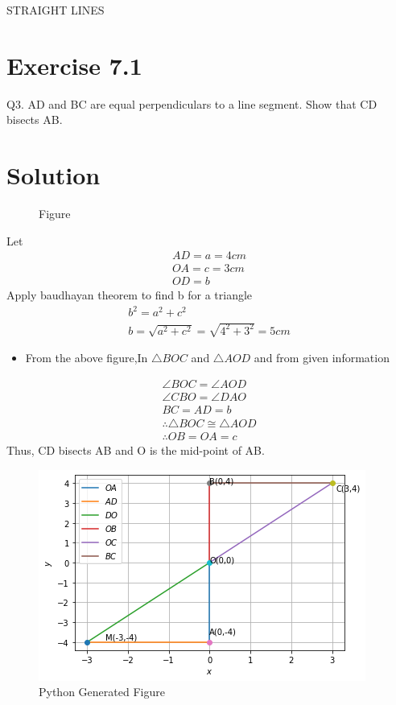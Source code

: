 \documentclass[12pt]{article}
\begin{document}
\begin{center}
\textbf\large{ STRAIGHT LINES}
\end{center}
\section*{Exercise 7.1}
Q3. AD and BC are equal perpendiculars to a line segment. Show that CD bisects AB.
\section*{Solution}

\begin{figure}[!h]
\begin{center}
\resizebox{0.3\linewidth}{!}
{

}
\caption{Figure}
\label{fig:foo}
\end{center}
\end{figure}
Let
\begin{align}
    AD=a=4cm \\
    OA=c=3cm \\
    OD=b
\end{align}
Apply baudhayan theorem to find b for a triangle 
\begin{align}
    b^2=a^2+c^2\\
    b=\sqrt{a^2+c^2}=\sqrt{4^2+3^2}=5cm
\end{align}
\begin{itemize}
    \item  From the above figure,In $\triangle{BOC}$ and $\triangle{AOD}$ and from given information
\end{itemize}
    \begin{align}
    \angle BOC = \angle AOD 
    \label{eq:ang}\\
    \angle CBO = \angle DAO 
    \label{eq:ang2}\\
    BC=AD = b \\
    \therefore \triangle{BOC} \cong \triangle{AOD}\\
    \therefore OB=OA= c
    \end{align}
Thus, CD bisects AB and O is the mid-point of AB.
\begin{figure}[!h]
 \begin{center}
  \includegraphics[width=\columnwidth]{./figs/python_fig.png}
 \end{center}
\caption{Python Generated Figure}
\label{fig:Python Generated Figure}
\end{figure}
\end{document}
